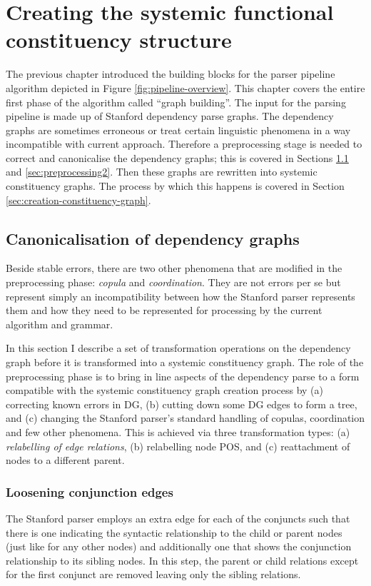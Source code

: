 \chapter{Creating the systemic functional constituency structure}
\label{ch:parsing-algorithm}

    The previous chapter introduced the building blocks for the parser pipeline algorithm depicted in Figure \ref{fig:pipeline-overview}. This chapter covers the entire first phase of the algorithm called ``graph building''. The input for the parsing pipeline is made up of Stanford dependency parse graphs. The dependency graphs are sometimes erroneous or treat certain linguistic phenomena in a way incompatible with current approach. Therefore a preprocessing stage is needed to correct and canonicalise the dependency graphs; this is covered in Sections \ref{sec:preprocessing1} and \ref{sec:preprocessing2}. Then these graphs are rewritten into systemic constituency graphs. The process by which this happens is covered in Section \ref{sec:creation-constituency-graph}.

\section{Canonicalisation of dependency graphs}
\label{sec:preprocessing1}
    Beside stable errors, there are two other phenomena that are modified in the preprocessing phase: \textit{copula} and \textit{coordination}. They are not errors per se but represent simply an incompatibility between how the Stanford parser represents them and how they need to be represented for processing by the current algorithm and grammar.

    In this section I describe a set of transformation operations on the dependency graph before it is transformed into a systemic constituency graph. The role of the preprocessing phase is to bring in line aspects of the dependency parse to a form compatible with the systemic constituency graph creation process by (a) correcting known errors in DG, (b) cutting down some DG edges to form a tree, and (c) changing the Stanford parser's standard handling of copulas, coordination and few other phenomena. This is achieved via three transformation types: (a) \textit{relabelling of edge relations}, (b) relabelling node POS, and (c) reattachment of nodes to a different parent. 

\subsection{Loosening conjunction edges}
    The Stanford parser employs an extra edge for each of the conjuncts such that there is one indicating the syntactic relationship to the child or parent nodes (just like for any other nodes) and additionally one that shows the conjunction relationship to its sibling nodes. In this step, the parent or child relations except for the first conjunct are removed leaving only the sibling relations. 

